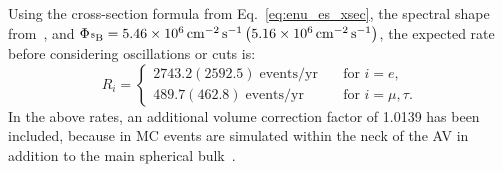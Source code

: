 Using the cross-section formula from Eq.~\ref{eq:enu_es_xsec}, the \beight{} spectral shape from~\cite{winterB8NeutrinoSpectrum2006}, and $\Phi_{\beight{}} = \SI{5.46e6}{\per\cm\squared\per\second} \left(\SI{5.16e6}{\per\cm\squared\per\second}\right)$, the expected rate before considering oscillations or cuts is:
\begin{equation*}
    R_{i} = 
    \begin{cases}
        2743.2 (2592.5)\; \text{events/yr} & \quad \text{for } i = e,\\
        489.7 (462.8)\;  \text{events/yr} & \quad \text{for } i = \mu,\tau.
    \end{cases}
\end{equation*}
In the above rates, an additional volume correction factor of 1.0139 has been included, because in MC events are simulated within the neck of the AV in addition to the main spherical bulk~\cite{caravacaValidationSNOProduction2019}. %

